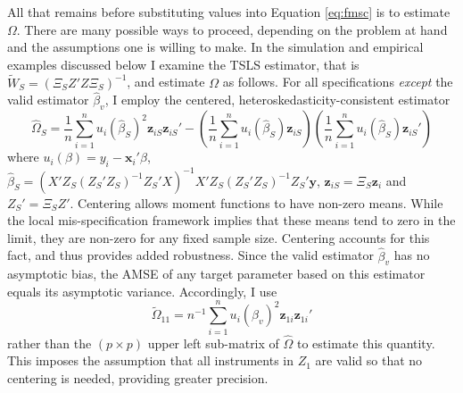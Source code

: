 All that remains before substituting values into Equation \ref{eq:fmsc} is to estimate $\Omega$. 
There are many possible ways to proceed, depending on the problem at hand and the assumptions one is willing to make. 
In the simulation and empirical examples discussed below I examine the TSLS estimator, that is $\widetilde{W}_S = (\Xi_S Z'Z\Xi_S)^{-1}$, and estimate $\Omega$ as follows. 
For all specifications \emph{except} the valid estimator $\widehat{\beta}_v$, I employ the centered, heteroskedasticity-consistent estimator
\begin{equation}
	\widehat{\Omega}_S = \frac{1}{n}\sum_{i=1}^n u_i(\widehat{\beta}_S)^2\mathbf{z}_{iS} \mathbf{z}_{iS}'  - \left(\frac{1}{n}\sum_{i=1}^n u_i(\widehat{\beta}_S)\mathbf{z}_{iS}   \right)\left(\frac{1}{n}\sum_{i=1}^n  u_i(\widehat{\beta}_S)\mathbf{z}_{iS}'  \right)
\end{equation}
where $u_i(\beta) = y_i - \mathbf{x}_i'\beta$, $\widehat{\beta}_S = (X'Z_S(Z_S'Z_S)^{-1}Z_S'X)^{-1}X'Z_S(Z_S'Z_S)^{-1}Z_S'\mathbf{y}$, $\mathbf{z}_{iS} = \Xi_S \mathbf{z}_i$ and $Z_S' = \Xi_S Z'$.
Centering allows moment functions to have non-zero means. 
While the local mis-specification framework implies that these means tend to zero in the limit, they are non-zero for any fixed sample size. 
Centering accounts for this fact, and thus provides added robustness. 
Since the valid estimator $\widehat{\beta}_v$ has no asymptotic bias, the AMSE of any target parameter based on this estimator equals its asymptotic variance. 
Accordingly, I use 
\begin{equation}
	\widetilde{\Omega}_{11}= n^{-1}\sum_{i=1}^n u_i(\widehat{\beta}_v)^2\mathbf{z}_{1i}\mathbf{z}_{1i}'
\end{equation}
rather than the $(p\times p)$ upper left sub-matrix of $\widehat{\Omega}$ to estimate this quantity. 
This imposes the assumption that all instruments in $Z_1$ are valid so that no centering is needed, providing greater precision.
